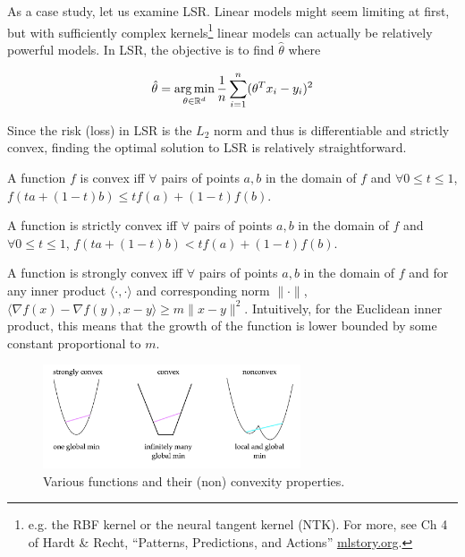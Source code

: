 As a case study, let us examine LSR. Linear models might seem limiting at first, but with sufficiently complex kernels\footnote{e.g. the RBF kernel or the neural tangent kernel (NTK). For more, see Ch 4 of Hardt \& Recht, ``Patterns, Predictions, and Actions'' \url{mlstory.org}.} linear models can actually be relatively powerful models. In LSR, the objective is to find $\hat{\theta}$ where

$$\hat{\theta} = \operatorname*{arg\,min}_{\theta\in\mathbb{R}^d} \frac{1}{n} \sum_{i = 1}^{n} (\theta^T x_i - y_i)^2$$

Since the risk (loss) in LSR is the $L_2$ norm and thus is differentiable and strictly convex, finding the optimal solution to LSR is relatively straightforward. 

\begin{definition}[Convexity]
A function $f$ is convex iff $\forall$ pairs of points $a, b$ in the domain of $f$ and $\forall 0 \le t \le 1$,
$f(ta + (1-t)b) \le tf(a) + (1-t)f(b)$.
\end{definition}

\begin{definition}
 A function is strictly convex iff $\forall$ pairs of points $a, b$ in the domain of $f$ and $\forall 0 \le t \le 1$, $f(ta + (1-t)b) < tf(a) + (1-t)f(b)$.
\end{definition}

\begin{definition}
 A function is strongly convex iff $\forall$ pairs of points $a, b$ in the domain of $f$ and for any inner product $\langle\cdot, \cdot \rangle$ and corresponding norm $\| \cdot \|$, $\langle \nabla f(x) - \nabla f(y), x - y \rangle \ge m \| x - y \|^2$. Intuitively, for the Euclidean inner product, this means that the growth of the function is lower bounded by some constant proportional to $m$.
\end{definition}

\begin{figure}
\centering
\includegraphics[width=3in]{graphics/convex.png}
\caption{Various functions and their (non) convexity properties.}
\end{figure}

